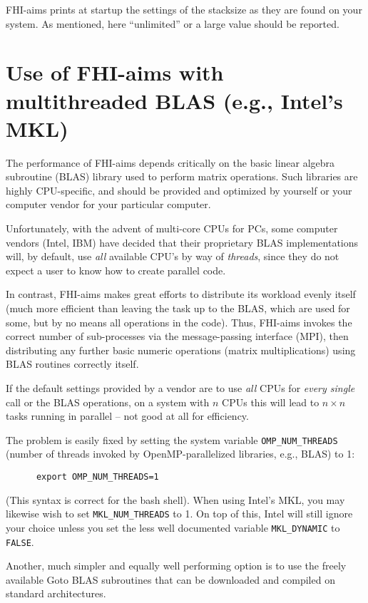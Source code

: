 FHI-aims prints at startup the settings of the stacksize as they are
found on your system. As mentioned, here ``unlimited'' or a large
value should be reported.

\section{Use of FHI-aims with multithreaded BLAS (e.g., Intel's MKL)}

The performance of FHI-aims depends critically on the basic linear
algebra subroutine (BLAS) library used to perform matrix
operations. Such libraries are highly CPU-specific, and should be
provided and optimized by yourself or your computer vendor for your
particular computer.

Unfortunately, with the advent of multi-core CPUs for PCs, some
computer vendors (Intel, IBM) have decided that their proprietary BLAS
implementations will, by default, use \emph{all} available CPU's by
way of \emph{threads}, since they do not expect a user to know how to
create parallel code.

In contrast, FHI-aims makes great efforts to distribute its workload
evenly itself (much more efficient than leaving the task up to the
BLAS, which are used for some, but by no means all operations in the
code). Thus, FHI-aims invokes the correct number of sub-processes via
the message-passing interface (MPI), then distributing any further
basic numeric operations (matrix multiplications) using BLAS routines
correctly itself.

If the default settings provided by a vendor are to use \emph{all}
CPUs for \emph{every single} call or the BLAS operations, on a system
with $n$ CPUs this will lead to $n\times n$ tasks running in parallel
-- not good at all for efficiency.

The problem is easily fixed by setting the system variable
\texttt{OMP\_NUM\_THREADS} (number of threads invoked by OpenMP-parallelized
libraries, e.g., BLAS) to 1:
    \begin{verbatim}
      export OMP_NUM_THREADS=1
    \end{verbatim}
(This syntax is correct for the bash shell). When using Intel's MKL, you
may likewise wish to set \texttt{MKL\_NUM\_THREADS} to 1. On top of
this, Intel will still ignore your choice unless you set the less well
documented variable \texttt{MKL\_DYNAMIC} to \texttt{FALSE}.

Another, much simpler and equally well performing option is to use the
freely available Goto BLAS subroutines that can be downloaded and
compiled on standard architectures.

